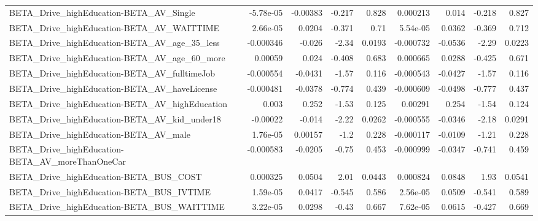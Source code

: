 \begin{tabular}{lrrrrrrrr}
BETA\_Drive\_highEducation-BETA\_AV\_Single            &   -5.78e-05 &     -0.00383 &   -0.217 &    0.828 &   0.000213 &       0.014 &       -0.218 &         0.827 \\
BETA\_Drive\_highEducation-BETA\_AV\_WAITTIME          &    2.66e-05 &       0.0204 &   -0.371 &     0.71 &   5.54e-05 &      0.0362 &       -0.369 &         0.712 \\
BETA\_Drive\_highEducation-BETA\_AV\_age\_35\_less       &   -0.000346 &       -0.026 &    -2.34 &   0.0193 &  -0.000732 &     -0.0536 &        -2.29 &        0.0223 \\
BETA\_Drive\_highEducation-BETA\_AV\_age\_60\_more       &     0.00059 &        0.024 &   -0.408 &    0.683 &   0.000665 &      0.0288 &       -0.425 &         0.671 \\
BETA\_Drive\_highEducation-BETA\_AV\_fulltimeJob       &   -0.000554 &      -0.0431 &    -1.57 &    0.116 &  -0.000543 &     -0.0427 &        -1.57 &         0.116 \\
BETA\_Drive\_highEducation-BETA\_AV\_haveLicense       &   -0.000481 &      -0.0378 &   -0.774 &    0.439 &  -0.000609 &     -0.0498 &       -0.777 &         0.437 \\
BETA\_Drive\_highEducation-BETA\_AV\_highEducation     &       0.003 &        0.252 &    -1.53 &    0.125 &    0.00291 &       0.254 &        -1.54 &         0.124 \\
BETA\_Drive\_highEducation-BETA\_AV\_kid\_under18       &    -0.00022 &       -0.014 &    -2.22 &   0.0262 &  -0.000555 &     -0.0346 &        -2.18 &        0.0291 \\
BETA\_Drive\_highEducation-BETA\_AV\_male              &    1.76e-05 &      0.00157 &     -1.2 &    0.228 &  -0.000117 &     -0.0109 &        -1.21 &         0.228 \\
BETA\_Drive\_highEducation-BETA\_AV\_moreThanOneCar    &   -0.000583 &      -0.0205 &    -0.75 &    0.453 &  -0.000999 &     -0.0347 &       -0.741 &         0.459 \\
BETA\_Drive\_highEducation-BETA\_BUS\_COST             &    0.000325 &       0.0504 &     2.01 &   0.0443 &   0.000824 &      0.0848 &         1.93 &        0.0541 \\
BETA\_Drive\_highEducation-BETA\_BUS\_IVTIME           &    1.59e-05 &       0.0417 &   -0.545 &    0.586 &   2.56e-05 &      0.0509 &       -0.541 &         0.589 \\
BETA\_Drive\_highEducation-BETA\_BUS\_WAITTIME         &    3.22e-05 &       0.0298 &    -0.43 &    0.667 &   7.62e-05 &      0.0615 &       -0.427 &         0.669 \\

\end{tabular}
